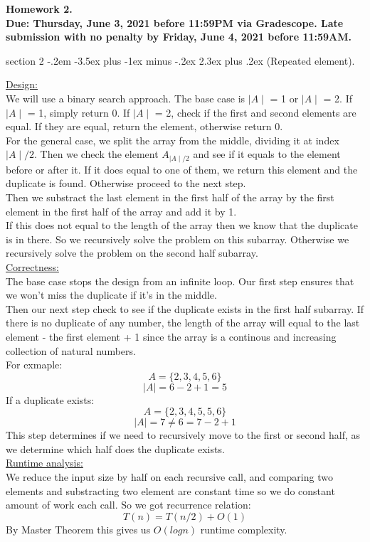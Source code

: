 \documentclass{article}
\makeatletter
\newenvironment{problem}{\@startsection
       {section}
       {2}
       {-.2em}
       {-3.5ex plus -1ex minus -.2ex}
       {2.3ex plus .2ex}
       {\pagebreak[3]%
       \large\bf\noindent{Problem }
       }
       }
\makeatother
\begin{document}
{\bf \noindent Homework 2. \\ Due: Thursday, June 3, 2021 before 11:59PM via Gradescope. Late submission with no penalty by Friday, June 4, 2021 before 11:59AM.}

\begin{problem}{(Repeated element).}
 
\underline{Design:}\\
We will use a binary search approach. The base case is \(\mid A\mid\) = 1 or \(\mid A\mid\) = 2. If \(\mid A\mid\) = 1, simply return 0. If \(\mid A\mid\) = 2, check if the first and second elements are equal. If they are equal, return the element, otherwise return 0.\\
For the general case, we split the array from the middle, dividing it at index \(\mid A\mid/2\). Then we check the element \(A_{\mid A\mid/2}\) and see if it equals to the element before or after it. If it does equal to one of them, we return this element and the duplicate is found. Otherwise proceed to the next step.\\
Then we substract the last element in the first half of the array by the first element in the first half of the array and add it by 1.\\
If this does not equal to the length of the array then we know that the duplicate is in there. So we recursively solve the problem on this subarray. Otherwise we recursively solve the problem on the second half subarray.\\
\underline{Correctness:}\\
The base case stops the design from an infinite loop. Our first step ensures that we won't miss the duplicate if it's in the middle.\\
Then our next step check to see if the duplicate exists in the first half subarray. If there is no duplicate of any number, the length of the array will equal to the last element - the first element + 1 since the array is a continous and increasing collection of natural numbers.\\
For exmaple:\\
\[A=\{2,3,4,5,6\}\]
\[\mid A\mid=6-2+1=5\]
If a duplicate exists:\\
\[A=\{2,3,4,5,5,6\}\]
\[\mid A\mid=7\neq6=7-2+1\]
This step determines if we need to recursively move to the first or second half, as we determine which half does the duplicate exists.\\
\underline{Runtime analysis:}\\
We reduce the input size by half on each recursive call, and comparing two elements and substracting two element are constant time so we do constant amount of work each call. So we got recurrence relation:\\
\[T(n)=T(n/2)+O(1)\]
By Master Theorem this gives us \(O(log{n})\) runtime complexity.


\end{problem}
\end{document}
